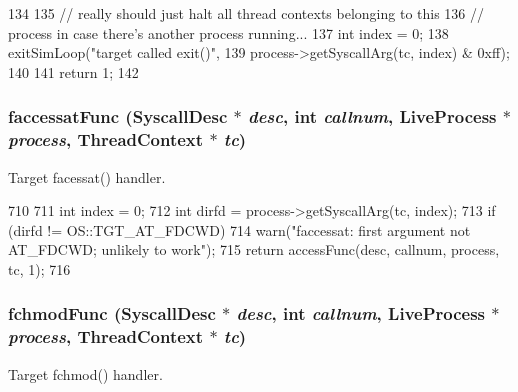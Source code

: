 \begin{DoxyCode}
134 {
135     // really should just halt all thread contexts belonging to this
136     // process in case there's another process running...
137     int index = 0;
138     exitSimLoop("target called exit()",
139                 process->getSyscallArg(tc, index) & 0xff);
140 
141     return 1;
142 }
\end{DoxyCode}
\hypertarget{syscall__emul_8hh_acc50ca24090796bbabb2797298ebfdef}{
\subsubsection[{faccessatFunc}]{ faccessatFunc ({\bf SyscallDesc} $\ast$ {\em desc}, \/  int {\em callnum}, \/  {\bf LiveProcess} $\ast$ {\em process}, \/  {\bf ThreadContext} $\ast$ {\em tc})}}
\label{syscall__emul_8hh_acc50ca24090796bbabb2797298ebfdef}


Target facessat() handler. 


\begin{DoxyCode}
710 {
711     int index = 0;
712     int dirfd = process->getSyscallArg(tc, index);
713     if (dirfd != OS::TGT_AT_FDCWD)
714         warn("faccessat: first argument not AT_FDCWD; unlikely to work");
715     return accessFunc(desc, callnum, process, tc, 1);
716 }
\end{DoxyCode}
\hypertarget{syscall__emul_8hh_a2a90cedb240b916a2546d84789f65edb}{
\subsubsection[{fchmodFunc}]{ fchmodFunc ({\bf SyscallDesc} $\ast$ {\em desc}, \/  int {\em callnum}, \/  {\bf LiveProcess} $\ast$ {\em process}, \/  {\bf ThreadContext} $\ast$ {\em tc})}}
\label{syscall__emul_8hh_a2a90cedb240b916a2546d84789f65edb}


Target fchmod() handler. 


